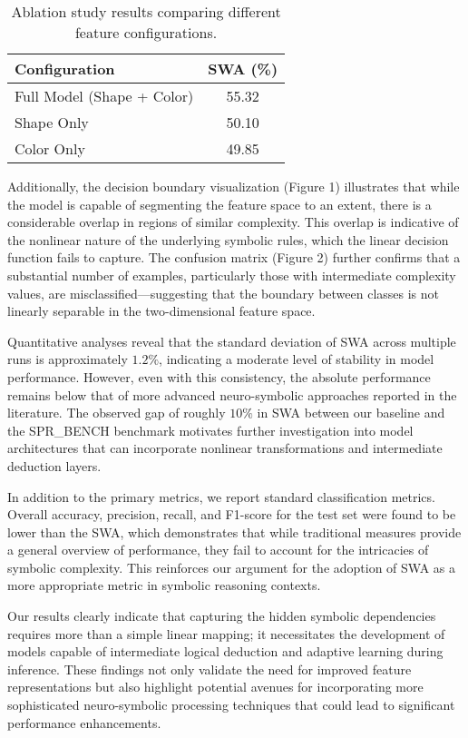 \documentclass{article}
\begin{document}
\begin{table}[h]
\centering
\begin{tabular}{|l|c|}
\hline
\textbf{Configuration} & \textbf{SWA (\%)} \\ \hline
Full Model (Shape + Color) & 55.32 \\ \hline
Shape Only & 50.10 \\ \hline
Color Only & 49.85 \\ \hline
\end{tabular}
\caption{Ablation study results comparing different feature configurations.}
\label{tab:ablation}
\end{table}

Additionally, the decision boundary visualization (Figure 1) illustrates that while the model is capable of segmenting the feature space to an extent, there is a considerable overlap in regions of similar complexity. This overlap is indicative of the nonlinear nature of the underlying symbolic rules, which the linear decision function fails to capture. The confusion matrix (Figure 2) further confirms that a substantial number of examples, particularly those with intermediate complexity values, are misclassified—suggesting that the boundary between classes is not linearly separable in the two-dimensional feature space.

Quantitative analyses reveal that the standard deviation of SWA across multiple runs is approximately \(1.2\%\), indicating a moderate level of stability in model performance. However, even with this consistency, the absolute performance remains below that of more advanced neuro-symbolic approaches reported in the literature. The observed gap of roughly \(10\%\) in SWA between our baseline and the SPR\_BENCH benchmark motivates further investigation into model architectures that can incorporate nonlinear transformations and intermediate deduction layers.

In addition to the primary metrics, we report standard classification metrics. Overall accuracy, precision, recall, and F1-score for the test set were found to be lower than the SWA, which demonstrates that while traditional measures provide a general overview of performance, they fail to account for the intricacies of symbolic complexity. This reinforces our argument for the adoption of SWA as a more appropriate metric in symbolic reasoning contexts.

Our results clearly indicate that capturing the hidden symbolic dependencies requires more than a simple linear mapping; it necessitates the development of models capable of intermediate logical deduction and adaptive learning during inference. These findings not only validate the need for improved feature representations but also highlight potential avenues for incorporating more sophisticated neuro-symbolic processing techniques that could lead to significant performance enhancements.
\end{document}
